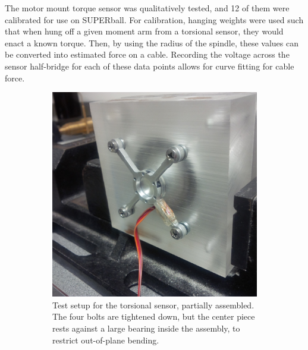 \documentclass[12pt]{report}
\begin{document}
The motor mount torque sensor was qualitatively tested, and 12 of them were calibrated for use on SUPERball.
For calibration, hanging weights were used such that when hung off a given moment arm from a torsional sensor, they would enact a known torque.
Then, by using the radius of the spindle, these values can be converted into estimated force on a cable.
Recording the voltage across the sensor half-bridge for each of these data points allows for curve fitting for cable force.

\begin{figure}[hbt]
  \begin{center}
    \begin{subfigure}[t]{0.45\textwidth}
      \includegraphics[width=1\textwidth]{./img/test_setup_exposed.jpg}
      \caption{Test setup for the torsional sensor, partially assembled. The four bolts are tightened down, but the center piece rests against a large bearing inside the assembly, to restrict out-of-plane bending.}
      \label{fig:sensor_test_setup_exposed}
    \end{subfigure}
    \begin{subfigure}[t]{0.45\textwidth}

\end{subfigure}
\end{center}
\end{figure}
\end{document}

